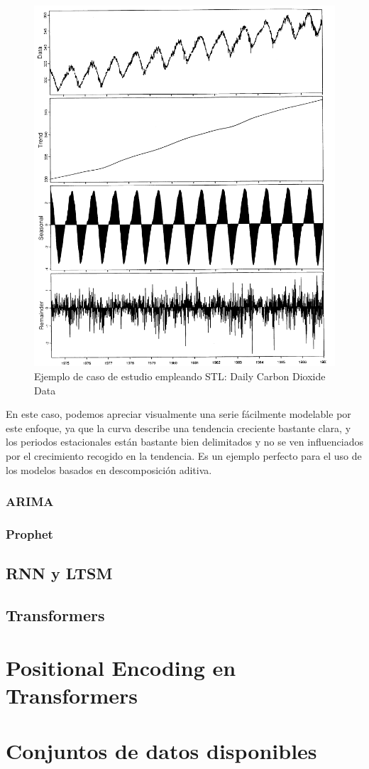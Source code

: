 \begin{figure}[!htp] %
	\centering
	\includegraphics[scale=0.35]{img/stl}
	\caption{Ejemplo de caso de estudio empleando STL: Daily Carbon Dioxide Data \cite{cleveland1990stl}}
	\label{stl}
\end{figure}  	

En este caso, podemos apreciar visualmente una serie fácilmente modelable por este enfoque, ya que la curva describe una tendencia creciente bastante clara, y los periodos estacionales están bastante bien delimitados y no se ven influenciados por el crecimiento recogido en la tendencia. Es un ejemplo perfecto para el uso de los modelos basados en descomposición aditiva.

\subsubsection{ARIMA}
\subsubsection{Prophet}

\subsection{RNN y LTSM}
\subsection{Transformers}

\section{Positional Encoding en Transformers}

\section{Conjuntos de datos disponibles}
